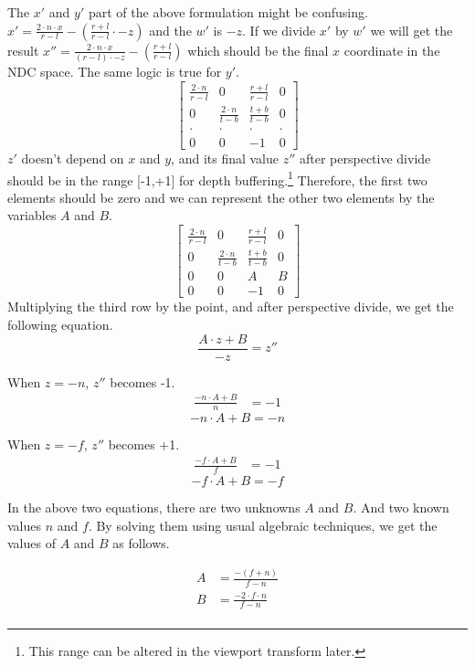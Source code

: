 The $x'$ and $y'$ part of the above formulation might be confusing. 
$ x' = \frac{2 \cdot n \cdot x}{r-l} - (\frac{r+l}{r-l}\cdot -z) $ and the $w'$ is 
$-z$. If we divide $x'$ by $w'$ we will get the result $ x'' = \frac{2 \cdot n \cdot x}{(r-l)\cdot -z} - (\frac{r+l}{r-l}) $ which should be the final $x$ coordinate in the NDC space. The same logic is true for $y'$.
\[
\begin{bmatrix}
\frac{2 \cdot n}{r-l} & 0 & \frac{r+l}{r-l} & 0 \\
0 & \frac{2 \cdot n}{t-b} & \frac{t+b}{t-b} & 0 \\
\cdot & \cdot & \cdot & \cdot \\
0 & 0 & -1 & 0
\end{bmatrix}
\]
$z'$ doesn't depend on $x$ and $y$, and its final value $z''$ after perspective divide should be in the range [-1,+1] for depth buffering.\footnote{This range can be altered in the viewport transform later.} Therefore, the first two elements should be zero and we can represent the other two elements by the variables $A$ and $B$.
\[
\begin{bmatrix}
\frac{2 \cdot n}{r-l} & 0 & \frac{r+l}{r-l} & 0 \\
0 & \frac{2 \cdot n}{t-b} & \frac{t+b}{t-b} & 0 \\
0 & 0 & A & B \\
0 & 0 & -1 & 0
\end{bmatrix}
\]
Multiplying the third row by the point, and after perspective divide, we get the following equation.
\[
\frac{A \cdot z  + B}{-z} = z''
\]

When $z = -n$, $z''$ becomes -1.
\begin{align*}
\frac{-n \cdot A  + B}{n} &= -1
\end{align*}
\begin{equation}
-n \cdot A  + B = -n    
\end{equation}


When $z = -f$, $z''$ becomes +1.
\begin{align*}
\frac{-f \cdot A  + B}{f} &= -1
\end{align*}
\begin{equation}
-f \cdot A  + B = -f    
\end{equation}

In the above two equations, there are two unknowns $A$ and $B$. And two known values $n$ and $f$. By solving them using usual algebraic techniques, we get the values of $A$ and $B$ as follows.

\begin{align*}
A &= \frac{-(f+n)}{f-n} \\
B &= \frac{-2\cdot f \cdot n}{f-n} \\
\end{align*}

